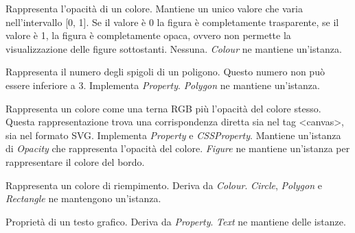 Rappresenta l'opacit\`a di un colore. Mantiene un unico valore che varia nell'intervallo [0, 1]. Se il valore \`e 0 la figura \`e completamente trasparente, se
il valore \`e 1, la figura \`e completamente opaca, ovvero non permette la visualizzazione delle figure sottostanti.
Nessuna.
\textit{Colour} ne mantiene un'istanza.

Rappresenta il numero degli spigoli di un poligono. Questo numero non pu\`o essere inferiore a 3.
Implementa \textit{Property}.
\textit{Polygon} ne mantiene un'istanza.

Rappresenta un colore come una terna RGB pi\`u l'opacit\`a del colore stesso. Questa rappresentazione trova una corrispondenza diretta sia nel tag <canvas>, sia nel formato SVG.
Implementa \textit{Property} e \textit{CSSProperty}. Mantiene un'istanza di \textit{Opacity} che rappresenta l'opacit\`a del colore.
\textit{Figure} ne mantiene un'istanza per rappresentare il colore del bordo.

Rappresenta un colore di riempimento.
Deriva da \textit{Colour}.
\textit{Circle}, \textit{Polygon} e \textit{Rectangle} ne mantengono un'istanza.

Propriet\`a di un testo grafico.
Deriva da \textit{Property}.
\textit{Text} ne mantiene delle istanze.

